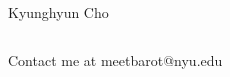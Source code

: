 \documentclass{beamer}
\begin{document}
\begin{frame}
\begin{columns}
    Kyunghyun Cho
\end{columns}
\vfill
\begin{columns}
    \column{\textwidth}
    \centering Contact me at meetbarot@nyu.edu
\end{columns}

\end{frame}
\end{document}
